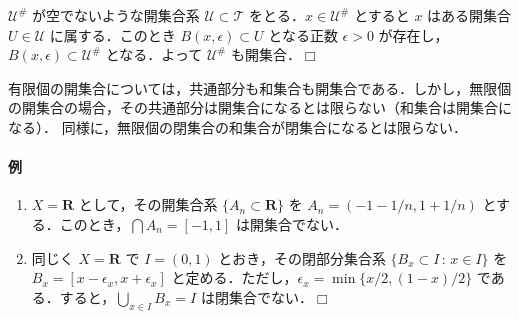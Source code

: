 \documentclass[b5paper,pandoc]{bxjsarticle}
\providecommand{\tightlist}{%
  \setlength{\itemsep}{0pt}\setlength{\parskip}{0pt}}
\let\oldparagraph\paragraph
\renewcommand{\paragraph}[1]{\oldparagraph{#1}\mbox{}}
\begin{document}
\(\mathscr U^\#\) が空でないような開集合系
\(\mathscr U \subset \mathscr T\) をとる．\(x \in \mathscr U^\#\)
とすると \(x\) はある開集合 \(U \in \mathscr U\) に属する．このとき
\(B(x, \epsilon) \subset U\) となる正数 \(\epsilon > 0\)
が存在し，\(B(x, \epsilon) \subset \mathscr U^\#\) となる．よって
\(\mathscr U^\#\) も開集合．\(\Box\)

有限個の開集合については，共通部分も和集合も開集合である．しかし，無限個の開集合の場合，その共通部分は開集合になるとは限らない（和集合は開集合になる）．
同様に，無限個の閉集合の和集合が閉集合になるとは限らない．

\hypertarget{ux4f8b-2}{%
\paragraph{例}\label{ux4f8b-2}}

\begin{enumerate}
\def\labelenumi{\roman{enumi})}
\tightlist
\item
  \(X = \boldsymbol{R}\) として，その開集合系
  \(\{ A_n \subset \boldsymbol{R} \}\) を \(A_n = (-1 - 1/n, 1 + 1/n)\)
  とする．このとき，\(\bigcap A_n = [-1, 1]\) は開集合でない．
\item
  同じく \(X = \boldsymbol{R}\) で \(I = (0, 1)\)
  とおき，その閉部分集合系 \(\{ B_x \subset I \,:\,x \in I \}\) を
  \(B_x = [x - \epsilon_x , x + \epsilon_x]\)
  と定める．ただし，\(\epsilon_x = \min \{ x/2, (1-x)/2 \}\)
  である．すると，\(\bigcup_{x \in I} B_x = I\) は閉集合でない．\(\Box\)
\end{enumerate}
\end{document}

